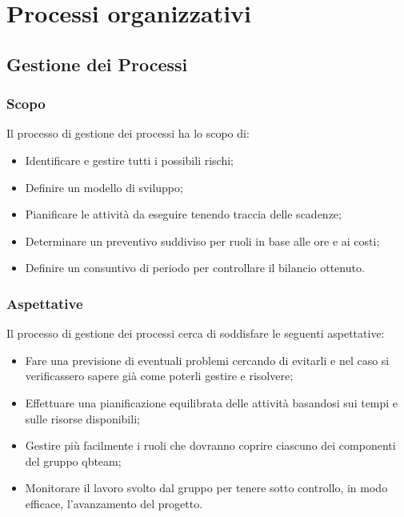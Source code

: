 \section{Processi organizzativi}
\subsection{Gestione dei Processi}
\subsubsection{Scopo}
Il processo di gestione dei processi ha lo scopo di:
\begin{itemize}
	\item Identificare e gestire tutti i possibili rischi;
	\item Definire un modello di sviluppo;
	\item Pianificare le attività da eseguire tenendo traccia delle scadenze;
	\item Determinare un preventivo suddiviso per ruoli in base alle ore e ai costi;
	\item Definire un consuntivo di periodo per controllare il bilancio ottenuto.
\end{itemize}

\subsubsection{Aspettative}
Il processo di gestione dei processi cerca di soddisfare le seguenti aspettative:
\begin{itemize}
	\item Fare una previsione di eventuali problemi cercando di evitarli e nel caso si verificassero sapere già come poterli gestire e risolvere;
	\item Effettuare una pianificazione equilibrata delle attività basandosi sui tempi e sulle risorse disponibili;
	\item Gestire più facilmente i ruoli che dovranno coprire ciascuno dei componenti del gruppo qbteam;
	\item Monitorare il lavoro svolto dal gruppo per tenere sotto controllo, in modo efficace, l'avanzamento del progetto.
\end{itemize}


